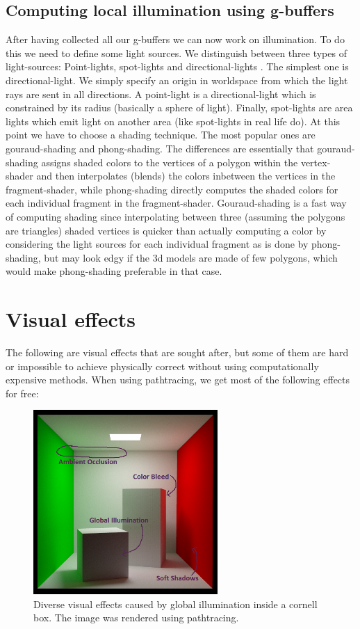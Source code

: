 \documentclass{ACGSeminar}
\begin{document}
	\subsection{Computing local illumination using g-buffers}
		After having collected all our g-buffers we can now work on illumination. To do this we need to define some light sources. We distinguish between three types of light-sources:
		Point-lights, spot-lights and directional-lights \cite{DST}. The simplest one is directional-light. We simply specify an origin in worldspace from which the light rays are sent in all directions. A point-light is a directional-light which is constrained by its radius (basically a sphere of light). Finally, spot-lights are area lights which emit light on another area (like spot-lights in real life do). 
		At this point we have to choose a shading technique. The most popular ones are gouraud-shading and phong-shading. The differences are essentially that gouraud-shading assigns shaded colors to the vertices of a polygon within the vertex-shader and then interpolates (blends) the colors inbetween the vertices in the fragment-shader, while phong-shading directly computes the shaded colors for each individual fragment in the fragment-shader. Gouraud-shading is a fast way of computing shading since interpolating between three (assuming the polygons are triangles) shaded vertices is quicker than actually computing a color by considering the light sources for each individual fragment as is done by phong-shading, but may look edgy if the 3d models are made of few polygons, which would make phong-shading preferable in that case. 

\section{Visual effects} \label{visual_effects}
	The following are visual effects that are sought after, but some of them are hard or impossible to achieve physically correct without using
	computationally expensive methods. When using pathtracing, we get most of the following effects for free: 
	\begin{figure}[htb!]%
	\begin{center}%
		\includegraphics[width=7cm]{img/visual_effects.png}
	\end{center}%
	\caption{Diverse visual effects caused by global illumination inside a cornell box. The image was rendered using pathtracing.}%
	\label{fig:visual_effects}%
	\end{figure}%
\end{document}
